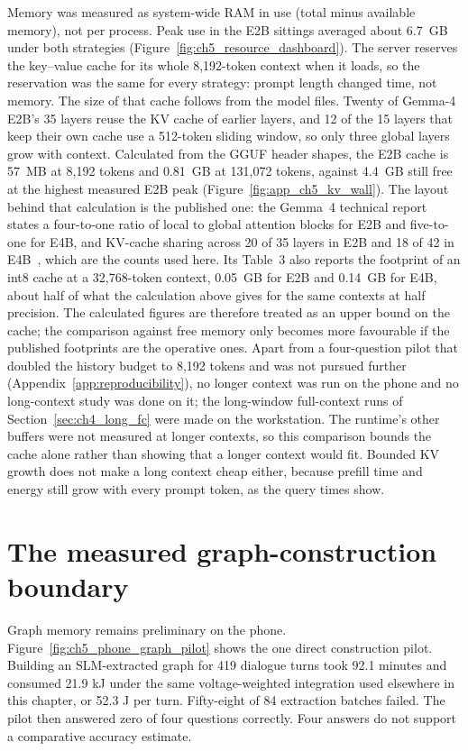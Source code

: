 Memory was measured as system-wide RAM in use (total minus available memory), not per process. Peak use in
the E2B sittings averaged about 6.7~GB under both strategies (Figure~\ref{fig:ch5_resource_dashboard}). The
server reserves the key--value cache for its whole 8,192-token context when it loads, so the reservation was
the same for every strategy: prompt length changed time, not memory. The size of that cache follows from the
model files. Twenty of Gemma-4 E2B's 35 layers reuse the KV cache of earlier layers, and 12 of the 15 layers
that keep their own cache use a 512-token sliding window, so only three global layers grow with context.
Calculated from the GGUF header shapes, the E2B cache is 57~MB at 8,192 tokens and 0.81~GB at 131,072 tokens,
against 4.4~GB still free at the highest measured E2B peak (Figure~\ref{fig:app_ch5_kv_wall}). The layout
behind that calculation is the published one: the Gemma~4 technical report states a four-to-one ratio of
local to global attention blocks for E2B and five-to-one for E4B, and KV-cache sharing across 20 of 35 layers
in E2B and 18 of 42 in E4B~\citep{gemma4}, which are the counts used here. Its Table~3 also reports the
footprint of an int8 cache at a 32,768-token context, 0.05~GB for E2B and 0.14~GB for E4B, about half of what
the calculation above gives for the same contexts at half precision. The calculated figures are therefore
treated as an upper bound on the cache; the comparison against free memory only becomes more favourable if
the published footprints are the operative ones. Apart from a four-question pilot that doubled the
history budget to 8,192 tokens and was not pursued further (Appendix~\ref{app:reproducibility}), no
longer context was run on the phone and no long-context study was done on it; the long-window
full-context runs of Section~\ref{sec:ch4_long_fc} were made on the workstation. The runtime's other
buffers were not measured at longer contexts, so this comparison bounds the cache alone rather than
showing that a longer context would fit.
Bounded KV growth does not make a long context cheap either, because prefill time and energy still grow with
every prompt token, as the query times show.

\section{The measured graph-construction boundary}
\label{sec:ch5_graph_boundary}

Graph memory remains preliminary on the phone. Figure~\ref{fig:ch5_phone_graph_pilot} shows the one
direct construction pilot. Building an SLM-extracted graph for 419 dialogue turns took 92.1 minutes
and consumed 21.9 kJ under the same voltage-weighted integration used elsewhere in this chapter, or
52.3 J per turn. Fifty-eight of 84 extraction batches failed. The pilot then answered zero of four
questions correctly. Four answers do not support a comparative accuracy estimate.

